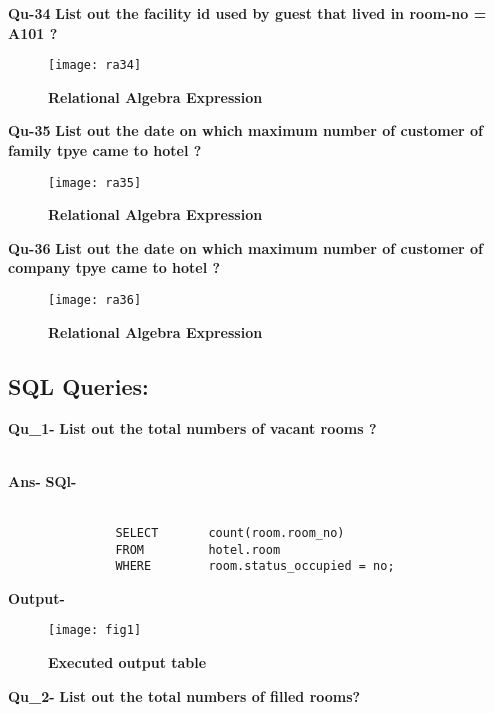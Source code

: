 \documentclass[a4,12pt]{report}
\begin{document}
\textbf{Qu-34} \textbf{ List out the facility id used by guest that lived in room-no = A101 ? }\\

\begin{figure}[hbtp]
\centering
\texttt{[image: ra34]}
\caption{\textbf{{\color{red}Relational Algebra Expression}}}
\end{figure}

\textbf{Qu-35} \textbf{ List out the date on which maximum number of customer of family tpye came to hotel ? }\\

\begin{figure}[hbtp]
\centering
\texttt{[image: ra35]}
\caption{\textbf{{\color{red}Relational Algebra Expression}}}
\end{figure}

\newpage
\textbf{Qu-36} \textbf{ List out the date on which maximum number of customer of company tpye came to hotel ? }\\

\begin{figure}[hbtp]
\centering
\texttt{[image: ra36]}
\caption{\textbf{{\color{red}Relational Algebra Expression}}}
\end{figure}

\subsection*{SQL Queries:}
\textbf{Qu\_1-} \textbf{List out the total numbers of vacant rooms ?} \\\

\textbf{Ans-}  \textbf{SQl-} \\\

\begin{lstlisting}
			   SELECT		count(room.room_no)
			   FROM			hotel.room 
			   WHERE		room.status_occupied = no;
\end{lstlisting}
			
\textbf{Output-} \\			   
\begin{figure}[hbtp]
\centering
\texttt{[image: fig1]}
\caption{\textbf{{\color{red}Executed output table}}}
\end{figure}


\textbf{Qu\_2-} \textbf{List out the total numbers of filled rooms?}\\\
\end{document}
